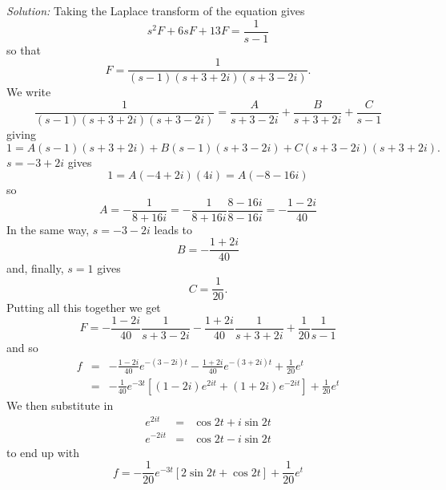 \documentclass[12pt]{article}
\newcommand{\soln}{\noindent\textit{Solution:}}
\begin{document}
\begin{enumerate}
\soln
Taking the Laplace transform of the equation gives
\begin{equation}
s^2F+6sF+13F=\frac{1}{s-1}
\end{equation}
so that
\begin{equation}
F=\frac{1}{(s-1)(s+3+2i)(s+3-2i)}.
\end{equation}
We write
\begin{equation}
\frac{1}{(s-1)(s+3+2i)(s+3-2i)}=\frac{A}{s+3-2i}+\frac{B}{s+3+2i}+\frac{C}{s-1}
\end{equation}
giving
\begin{equation}
1=A(s-1)(s+3+2i)+B(s-1)(s+3-2i)+C(s+3-2i)(s+3+2i).
\end{equation}
$s=-3+2i$ gives
\begin{equation}
1=A(-4+2i)(4i)=A(-8-16i)
\end{equation}
so
\begin{equation}
A=-\frac{1}{8+16i}=-\frac{1}{8+16i}\frac{8-16i}{8-16i}=-\frac{1-2i}{40}
\end{equation}
In the same way, $s=-3-2i$ leads to 
\begin{equation}
B=-\frac{1+2i}{40}
\end{equation}
and, finally, $s=1$ gives
\begin{equation}
C=\frac{1}{20}.
\end{equation}
\vskip 1cm
Putting all this together we get
\begin{equation}
F=-\frac{1-2i}{40}\frac{1}{s+3-2i}-\frac{1+2i}{40}\frac{1}{s+3+2i}+\frac{1}{20}\frac{1}{s-1}
\end{equation}
and so 
\begin{eqnarray}
f&=&-\frac{1-2i}{40}e^{-(3-2i)t}-\frac{1+2i}{40}e^{-(3+2i)t}+\frac{1}{20}e^t\nonumber\\
&=&-\frac{1}{40}e^{-3t}\left[(1-2i)e^{2it}+(1+2i)e^{-2it}\right]+\frac{1}{20}e^t
\end{eqnarray}
We then substitute in 
\begin{eqnarray}
e^{2it}&=&\cos{2t}+i\sin{2t}\nonumber\\
e^{-2it}&=&\cos{2t}-i\sin{2t}
\end{eqnarray}
to end up with 
\begin{equation}
f=-\frac{1}{20}e^{-3t}[2\sin{2t}+\cos{2t}]+\frac{1}{20}e^t
\end{equation}


\end{enumerate}
\end{document}
